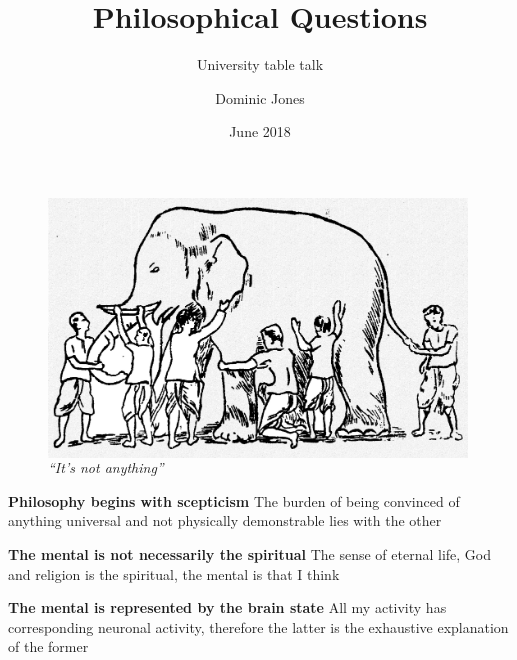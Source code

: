 \documentclass[xcolor=dvipsnames]{beamer}
\title{Philosophical Questions}
\subtitle{University table talk}
\author{Dominic Jones}
\date{June 2018}
\begin{document}
\begin{frame}[plain]
  \titlepage
\end{frame}


\begin{frame}[plain]
\begin{figure}
  \centering
  \begin{columns}
    \centering
    \includegraphics[width=0.99\textwidth]{elephant}
    \caption {\emph{``It's not anything''}}
  \end{columns}
\end{figure}
\end{frame}


\begin{frame}[plain]
\textbf{Philosophy begins with scepticism}\newline
The burden of being convinced of anything universal and not physically demonstrable lies with the other \vspace{10mm}

\textbf{The mental is not necessarily the spiritual}\newline
The sense of eternal life, God and religion is the spiritual, the mental is that I think \vspace{10mm}

\textbf{The mental is represented by the brain state}\newline
All my activity has corresponding neuronal activity, therefore the latter is the exhaustive explanation of the former \vspace{10mm}
\end{frame}
\end{document}
